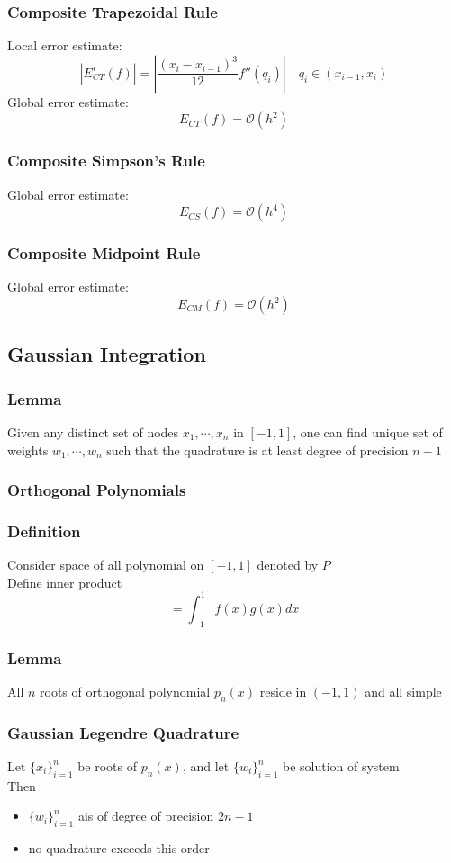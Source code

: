 \documentclass[11pt]{article}
\newcommand{\mO}{\mathcal{O}}
\begin{document}
\subsubsection*{Composite Trapezoidal Rule}
Local error estimate:
\[|E_{CT}^i(f)| = |\dfrac{(x_{i}-x_{i-1})^3}{12}f''(q_i)|\quad q_i\in(x_{i-1},x_i)\]
Global error estimate:
\[E_{CT}(f)=\mO(h^2)\]
\subsubsection*{Composite Simpson's Rule}
Global error estimate: 
\[E_{CS}(f)=\mO(h^4)\]
\subsubsection*{Composite Midpoint Rule}
Global error estimate:
\[E_{CM}(f)=\mO(h^2)\]
\subsection{Gaussian Integration}
\subsubsection*{Lemma}
Given any distinct set of nodes $x_1,\cdots,x_n$ in $[-1,1]$, one can find unique set 
of weights $w_1,\cdots,w_n$ such that the quadrature is at least degree of precision $n-1$
\subsubsection{Orthogonal Polynomials}
\subsubsection*{Definition}
Consider space of all polynomial on $[-1,1]$ denoted by $P$ \\
Define inner product \[<f,g>=\int_{-1}^{1}f(x)g(x)dx\]
\subsubsection*{Lemma}
All $n$ roots of orthogonal polynomial $p_n(x)$ reside in $(-1,1)$ and all simple
\subsubsection*{Gaussian Legendre Quadrature}
Let $\{x_i\}_{i=1}^n$ be roots of $p_n(x)$, and let $\{w_i\}_{i=1}^n$ be solution of system \\
Then 
\begin{itemize}
  \item $\{w_i\}_{i=1}^n$ ais of degree of precision $2n-1$
  \item no quadrature exceeds this order 
\end{itemize}
\end{document}
